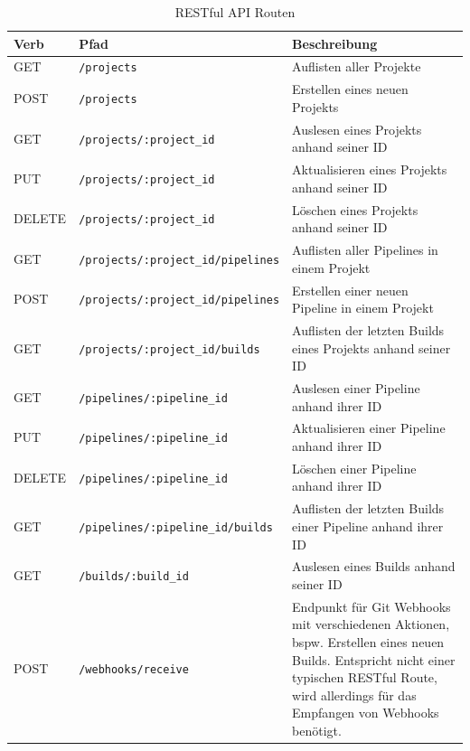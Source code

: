 \begin{table}[H]
  \footnotesize
  \begin{tabularx}{\textwidth}{| l | l | X |}
    \hline
    \textbf{Verb} & \textbf{Pfad} & \textbf{Beschreibung} \\ \hline
    GET & {\scriptsize \texttt{/projects}} & Auflisten aller Projekte \\ \hline
    POST & {\scriptsize \texttt{/projects}} & Erstellen eines neuen Projekts \\ \hline
    GET & {\scriptsize \texttt{/projects/:project\_id}} & Auslesen eines Projekts anhand seiner ID \\ \hline
    PUT & {\scriptsize \texttt{/projects/:project\_id}} & Aktualisieren eines Projekts anhand seiner ID \\ \hline
    DELETE & {\scriptsize \texttt{/projects/:project\_id}} & Löschen eines Projekts anhand seiner ID \\ \hline
    GET & {\scriptsize \texttt{/projects/:project\_id/pipelines}} & Auflisten aller Pipelines in einem Projekt \\ \hline
    POST & {\scriptsize \texttt{/projects/:project\_id/pipelines}} & Erstellen einer neuen Pipeline in einem Projekt \\ \hline
    GET & {\scriptsize \texttt{/projects/:project\_id/builds}} & Auflisten der letzten Builds eines Projekts anhand seiner ID \\ \hline
    GET & {\scriptsize \texttt{/pipelines/:pipeline\_id}} & Auslesen einer Pipeline anhand ihrer ID \\ \hline
    PUT & {\scriptsize \texttt{/pipelines/:pipeline\_id}} & Aktualisieren einer Pipeline anhand ihrer ID \\ \hline
    DELETE & {\scriptsize \texttt{/pipelines/:pipeline\_id}} & Löschen einer Pipeline anhand ihrer ID \\ \hline
    GET & {\scriptsize \texttt{/pipelines/:pipeline\_id/builds}} & Auflisten der letzten Builds einer Pipeline anhand ihrer ID \\ \hline
    GET & {\scriptsize \texttt{/builds/:build\_id}} & Auslesen eines Builds anhand seiner ID \\
    \hline\hline
    POST & {\scriptsize \texttt{/webhooks/receive}} & Endpunkt für Git Webhooks mit verschiedenen Aktionen, bspw. Erstellen eines neuen Builds. Entspricht nicht einer typischen RESTful Route, wird allerdings für das Empfangen von Webhooks benötigt. \\
    \hline
  \end{tabularx}
  \caption{RESTful API Routen}
  \label{tab:rest-routes}
\end{table}

